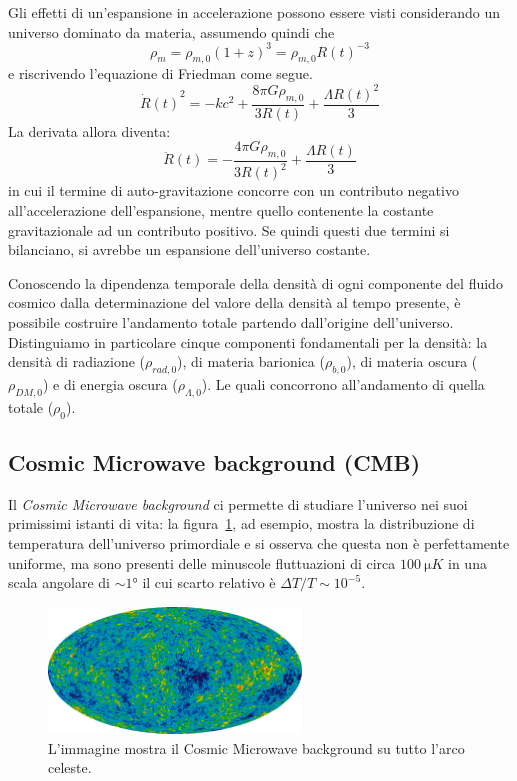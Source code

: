 Gli effetti di un'espansione in accelerazione possono essere visti considerando un universo dominato da materia, assumendo quindi che
\[
    \rho_{m} = \rho_{m,0}{(1+z)}^3 = \rho_{m,0}{R(t)}^{-3}
\]
e riscrivendo l'equazione di Friedman come segue.
\[
    {\dot{R}(t)}^2 = - kc^2 + \frac{8\pi G \rho_{m,0}}{3R(t)} + \frac{\Lambda {R(t)}^2}{3}
\]
La derivata allora diventa:
\[
    {\ddot{R}(t)} = -\frac{4\pi G \rho_{m,0}}{3{R(t)}^2}+ \frac{\Lambda R(t)}{3}
\]
in cui il termine di auto-gravitazione concorre con un contributo negativo all'accelerazione dell'espansione, mentre quello contenente la costante gravitazionale ad un contributo positivo. Se quindi questi due termini si bilanciano, si avrebbe un espansione dell'universo costante.

Conoscendo la dipendenza temporale della densità di ogni componente del fluido cosmico dalla determinazione del valore della densità al tempo presente, è possibile costruire l'andamento totale partendo dall'origine dell'universo. Distinguiamo in particolare cinque componenti fondamentali per la densità: la densità di radiazione ($\rho_{rad,0}$), di materia barionica ($\rho_{b,0}$), di materia oscura ($\rho_{DM,0}$) e di energia oscura ($\rho_{\Lambda, 0}$). Le quali concorrono all'andamento di quella totale ($\rho_{0}$).

\subsection{Cosmic Microwave background (CMB)}\label{sec:CMB}
Il \emph{Cosmic Microwave background} ci permette di studiare l'universo nei suoi primissimi istanti di vita: la figura~\ref{fig:CMB1}, ad esempio, mostra la distribuzione di temperatura dell'universo primordiale e si osserva che questa non è perfettamente uniforme, ma sono presenti delle minuscole fluttuazioni di circa $\SI{100}{\micro K}$ in una scala angolare di $\sim 1\si{\degree}$ il cui scarto relativo è $\Delta T/T \sim 10^{-5}$.
\begin{figure}
    \centering
    \includegraphics[width = 0.6\textwidth]{immagini/CMB1.png}
    \caption{L'immagine mostra il Cosmic Microwave background su tutto l'arco celeste.}\label{fig:CMB1}
\end{figure}

